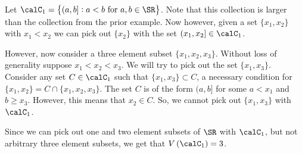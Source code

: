 \begin{example*}
	\label{ex:vc-indices-2}
	Let \(\calC_1 = \left\{(a,b]:a<b\text{ for } a,b \in \SR\right\}\). Note that this collection is larger than the collection from the prior example. Now however, given a set \(\{x_1,x_2\} \) with \(x_1 < x_2\) we can pick out \(\{x_2\}\) with the set \((x_1,x_2]\in\calC_1\).

	However, now consider a three element subset \(\{x_1,x_2,x_3\}\). Without loss of generality suppose \(x_1 < x_2 < x_3\). We will try to pick out the set \(\{x_1,x_3\}\). Consider any set \(C\in \calC_1\) such that \(\{x_1,x_3\}\subset C \), a necessary condition for \(\{x_1,x_2\} = C \cap \{x_1,x_2,x_3\}\). The set \(C\) is of the form \((a,b]\) for some \(a < x_1\) and \(b \geq x_3\). However, this means that \(x_2 \in C\). So, we cannot pick out \(\{x_1,x_3\} \) with \(\calC_1\). 

	Since we can pick out one and two element subsets of \(\SR\) with \(\calC_1\), but not arbitrary three element subsets, we get that \(V\left(\calC_1\right)=3\).
\end{example*}


